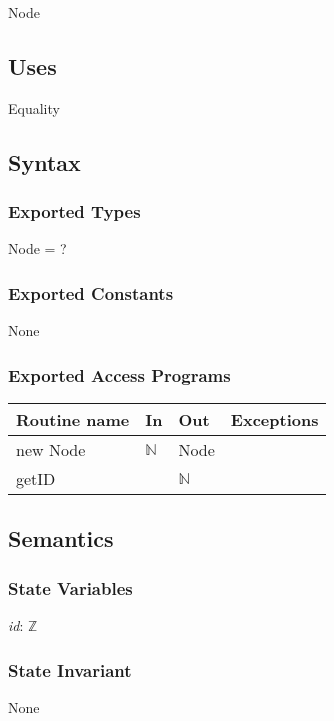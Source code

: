 \documentclass[12pt]{article}
\begin{document}
Node

\subsection*{Uses}

Equality

\subsection*{Syntax}

\subsubsection*{Exported Types}

Node = ?

\subsubsection* {Exported Constants}

None

\subsubsection*{Exported Access Programs}

\begin{tabular}{| l | l | l | l |}
	\hline
	\textbf{Routine name} & \textbf{In} & \textbf{Out} & \textbf{Exceptions}\\
	\hline
	new Node & $\mathbb{N}$ & Node & ~\\
	\hline
	getID & ~ & $\mathbb{N}$ & ~\\
	\hline
\end{tabular}

\subsection*{Semantics}

\subsubsection*{State Variables}

\textit{id}: $\mathbb{Z}$

\subsubsection*{State Invariant}

None
\end{document}
